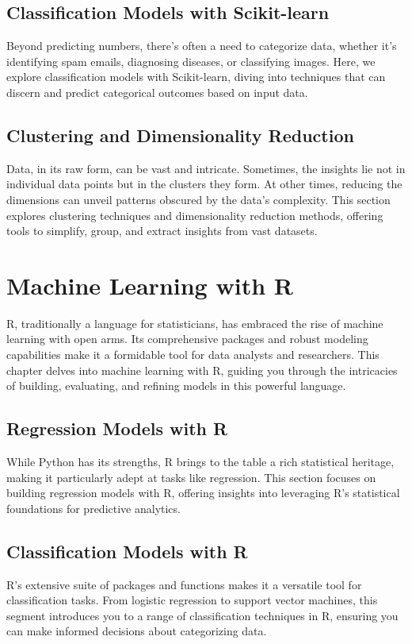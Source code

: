 \documentclass[a4paper,12pt]{book}
\begin{document}
\section{Classification Models with Scikit-learn}
Beyond predicting numbers, there's often a need to categorize data, whether it's identifying spam emails, diagnosing diseases, or classifying images. Here, we explore classification models with Scikit-learn, diving into techniques that can discern and predict categorical outcomes based on input data.

\section{Clustering and Dimensionality Reduction}
Data, in its raw form, can be vast and intricate. Sometimes, the insights lie not in individual data points but in the clusters they form. At other times, reducing the dimensions can unveil patterns obscured by the data's complexity. This section explores clustering techniques and dimensionality reduction methods, offering tools to simplify, group, and extract insights from vast datasets.

\chapter{Machine Learning with R}
R, traditionally a language for statisticians, has embraced the rise of machine learning with open arms. Its comprehensive packages and robust modeling capabilities make it a formidable tool for data analysts and researchers. This chapter delves into machine learning with R, guiding you through the intricacies of building, evaluating, and refining models in this powerful language.

\section{Regression Models with R}
While Python has its strengths, R brings to the table a rich statistical heritage, making it particularly adept at tasks like regression. This section focuses on building regression models with R, offering insights into leveraging R's statistical foundations for predictive analytics.

\section{Classification Models with R}
R's extensive suite of packages and functions makes it a versatile tool for classification tasks. From logistic regression to support vector machines, this segment introduces you to a range of classification techniques in R, ensuring you can make informed decisions about categorizing data.
\end{document}
